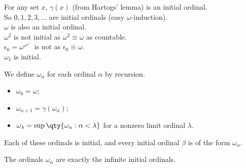 \begin{example}
    For any set $x$, $\gamma(x)$ (from Hartogs' lemma) is an initial ordinal. \\
    So $0, 1, 2, 3, \dots$ are initial ordinals (easy $\omega$-induction). \\
    $\omega$ is also an initial ordinal. \\
    $\omega^2$ is not initial as $\omega^2 \equiv \omega$ as countable. \\
    $\epsilon_0 = \omega^{\omega^{\omega^{\dots}}}$ is not as $\epsilon_0 \equiv \omega$. \\
    $\omega_1$ is initial.
\end{example}

We define $\omega_\alpha$ for each ordinal $\alpha$ by recursion.
\begin{itemize}
    \item $\omega_0 = \omega$;
    \item $\omega_{\alpha + 1} = \gamma(\omega_\alpha)$;
    \item $\omega_\lambda = \sup\qty{\omega_\alpha : \alpha < \lambda}$ for a nonzero limit ordinal $\lambda$.
\end{itemize}
Each of these ordinals is initial, and every initial ordinal $\beta$ is of the form $\omega_\alpha$.

\begin{proposition}
    The ordinals $\omega_\alpha$ are exactly the infinite initial ordinals.
\end{proposition}

